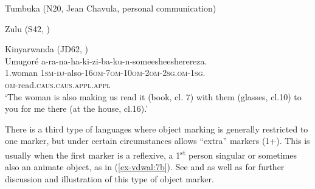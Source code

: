 \documentclass[output=paper
,modfonts
,nonflat]{langsci/langscibook}
\begin{document}
\begin{exe}
\ex Tumbuka (N20, Jean Chavula, personal communication) \label{ex-vdwal:4} 
	\xlist
	\endxlist
\end{exe}

\begin{exe}
\ex Zulu (S42, \citealt[220]{Zeller2012})\label{ex-vdwal:5}
	\xlist
	\endxlist
\end{exe}

\begin{exe}
\ex Kinyarwanda (JD62, \citealt[183]{Beaudoin-Lietz_et_al2004})\label{ex-vdwal:6}\\
	\gll Umugoré a-ra-na-ha-ki-zi-ba-ku-n-someesheesherereza.\\
	1.woman{} \textsc{1sm}-\textsc{dj}-also-\textsc{16om}-\textsc{7om}-\textsc{10om}-\textsc{2om}-\textsc{2sg}.\textsc{om}-\textsc{1sg}.\\ \textsc{om}-read.\textsc{caus}.\textsc{caus}.\textsc{appl}.\textsc{appl}\\
	\glt `The woman is also making us read it (book, cl. 7) with them (glasses, cl.10) to you for me there (at the house, cl.16).'
\end{exe}
There is a third type of languages where object marking is generally restricted to one marker, but under certain circumstances allows ``extra'' markers (1+). This is usually when the first marker is a reflexive, a 1\textsuperscript{st} person singular or sometimes also an animate object, as in (\ref{ex-vdwal:7b}). See \citet{Polak1986} and \citet{Marlo2014, Marlo2015} as well as \citet{Sikuku2012} for further discussion and illustration of this type of object marker.
\end{document}
